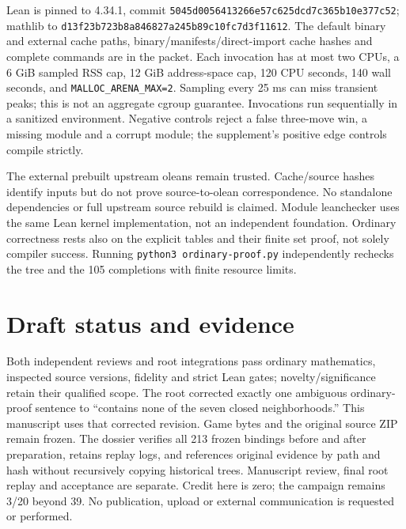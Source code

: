 \documentclass[11pt]{article}
\begin{document}
Lean is pinned to 4.34.1, commit
\texttt{5045d0056413266e57c6}\allowbreak\texttt{25dcd7c365b10e377c52}; mathlib to
\texttt{d13f23b723b8a846827a}\allowbreak\texttt{245b89c10fc7d3f11612}.
The default binary and external cache paths, binary/manifests/direct-import cache hashes and complete commands are in the packet. Each invocation has at most two CPUs, a 6 GiB sampled RSS cap, 12 GiB address-space cap, 120 CPU seconds, 140 wall seconds, and \texttt{MALLOC\_ARENA\_MAX=2}. Sampling every 25 ms can miss transient peaks; this is not an aggregate cgroup guarantee. Invocations run sequentially in a sanitized environment. Negative controls reject a false three-move win, a missing module and a corrupt module; the supplement's positive edge controls compile strictly.

The external prebuilt upstream oleans remain trusted. Cache/source hashes identify inputs but do not prove source-to-olean correspondence. No standalone dependencies or full upstream source rebuild is claimed. Module leanchecker uses the same Lean kernel implementation, not an independent foundation. Ordinary correctness rests also on the explicit tables and their finite set proof, not solely compiler success. Running \texttt{python3 ordinary-proof.py} independently rechecks the tree and the 105 completions with finite resource limits.

\section{Draft status and evidence}
Both independent reviews and root integrations pass ordinary mathematics, inspected source versions, fidelity and strict Lean gates; novelty/significance retain their qualified scope. The root corrected exactly one ambiguous ordinary-proof sentence to ``contains none of the seven closed neighborhoods.'' This manuscript uses that corrected revision. Game bytes and the original source ZIP remain frozen. The dossier verifies all 213 frozen bindings before and after preparation, retains replay logs, and references original evidence by path and hash without recursively copying historical trees. Manuscript review, final root replay and acceptance are separate. Credit here is zero; the campaign remains 3/20 beyond 39. No publication, upload or external communication is requested or performed.
\end{document}
